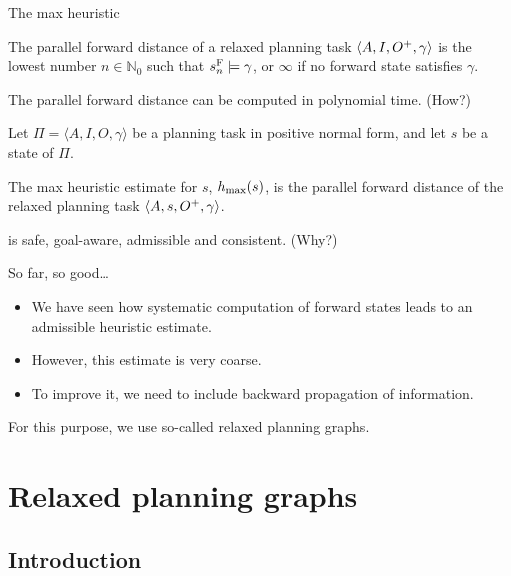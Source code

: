 \documentclass{gkibeamer}
\begin{document}
\begin{frame}{The max heuristic \hmax}
  \begin{definition}
    The \alert{parallel forward distance} of a relaxed planning
    task $\langle A, I, {O}^+, \gamma\rangle$ is the lowest number
    $n \in \mathbb N_0$ such that $s^{\text F}_n \models \gamma$, or
    $\infty$ if no forward state satisfies $\gamma$.
  \end{definition}

   The parallel forward distance can be computed in
  polynomial time. (How?)

  \medskip

  \begin{definition}
    Let $\Pi = \langle A, I, O, \gamma\rangle$ be a planning task in
    positive normal form, and let $s$ be a state of $\Pi$.

    The \alert{max heuristic} estimate for $s$,
    \alert{$h_{\text{max}}(s)$}, is the parallel forward distance of the
    relaxed planning task $\langle A, s, {O}^+, \gamma\rangle$.
  \end{definition}
  
   {\hmax} is safe, goal-aware, admissible and
  consistent. (Why?)
\end{frame}

\begin{frame}{So far, so good\dots}
  \begin{itemize}
  \item We have seen how systematic computation of forward states
    leads to an admissible heuristic estimate.
  \item However, this estimate is \alert{very coarse}.
  \item To improve it, we need to include \alert{backward propagation}
    of information.
  \end{itemize}
  
  For this purpose, we use so-called \alert{relaxed planning graphs}.
\end{frame}

\section{Relaxed planning graphs}
\subsection{Introduction}
\end{document}
